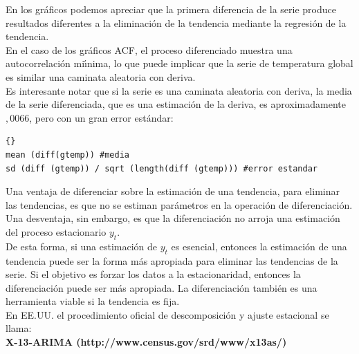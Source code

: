 En los gr\'aficos podemos apreciar que la primera diferencia de la serie produce resultados diferentes a la eliminaci\'on de la tendencia mediante la regresi\'on de la tendencia.\\
En el caso de los gr\'aficos ACF, el proceso diferenciado muestra una autocorrelaci\'on mi\'{\i}nima, lo que puede implicar que la serie de temperatura global es similar una caminata aleatoria con deriva.\\
Es interesante notar que si la serie es una caminata aleatoria con deriva, la media de la serie diferenciada, que es una estimaci\'on de la deriva, es aproximadamente $,0066$, pero con un gran error est\'andar:\\
\begin{lstlisting}[title={‘Código R: ejemplo 1: sobre la descomposición de una serie - media y error estandar’},basicstyle=\ttfamily]{}
mean (diff(gtemp)) #media
sd (diff (gtemp)) / sqrt (length(diff (gtemp))) #error estandar
\end{lstlisting}


Una ventaja de diferenciar sobre la estimaci\'on de una tendencia,  para eliminar las tendencias, es que no se estiman par\'ametros en la operaci\'on de diferenciaci\'on. Una desventaja, sin embargo, es que la diferenciaci\'on no arroja una estimaci\'on del proceso estacionario $y_t$.\\
De esta forma, si una estimaci\'on de $y_t$ es esencial, entonces la estimación de una tendencia puede ser la forma más apropiada para eliminar las tendencias de la serie. Si el objetivo es forzar los datos a la estacionaridad, entonces la diferenciaci\'on puede ser m\'as apropiada. La diferenciaci\'on tambi\'en es una herramienta viable si la tendencia es fija.\\
En EE.UU. el procedimiento oficial de descomposici\'on y ajuste estacional se llama:\\
\textbf{X-13-ARIMA (http://www.census.gov/srd/www/x13as/)}

